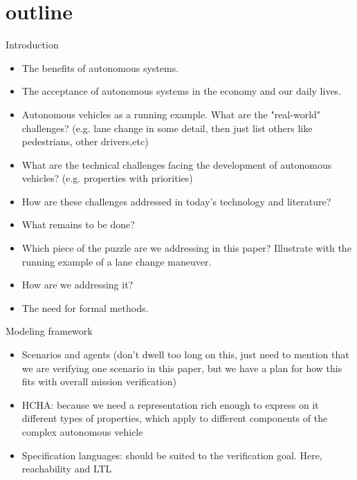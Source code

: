 \section{outline}
\label{outline}

Introduction
\begin{itemize}
	\item The benefits of autonomous systems.
	
	\item The acceptance of autonomous systems in the economy and our daily lives.
	
	\item Autonomous vehicles as a running example. What are the "real-world" challenges? (e.g. lane change in some detail, then just list others like pedestrians, other drivers,etc)
	
	\item What are the technical challenges facing the development of autonomous vehicles? (e.g. properties with priorities)
	
	\item How are these challenges addressed in today's technology and literature?
	
	\item What remains to be done?
	
	\item Which piece of the puzzle are we addressing in this paper? Illustrate with the running example of a lane change maneuver.
	
	\item How are we addressing it?
	
	\item The need for formal methods.
\end{itemize}



Modeling framework
\begin{itemize}
	\item Scenarios and agents (don't dwell too long on this, just need to mention that we are verifying one scenario in this paper, but we have a plan for how this fits with overall mission verification)
	
	\item HCHA: because we need a representation rich enough to express on it different types of properties, which apply to different components of the complex autonomous vehicle
	
	\item Specification languages: should be suited to the verification goal. Here, reachability and LTL

\end{itemize}

